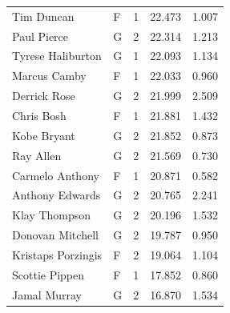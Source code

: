 \begin{table}[t]
\begin{tabular*}{\linewidth}{@{\extracolsep{\fill}}llcrr}
Tim Duncan & F & 1 & 22.473 & 1.007 \\ 
Paul Pierce & G & 2 & 22.314 & 1.213 \\ 
Tyrese Haliburton & G & 1 & 22.093 & 1.134 \\ 
Marcus Camby & F & 1 & 22.033 & 0.960 \\ 
Derrick Rose & G & 2 & 21.999 & 2.509 \\ 
Chris Bosh & F & 1 & 21.881 & 1.432 \\ 
Kobe Bryant & G & 2 & 21.852 & 0.873 \\ 
Ray Allen & G & 2 & 21.569 & 0.730 \\ 
Carmelo Anthony & F & 1 & 20.871 & 0.582 \\ 
Anthony Edwards & G & 2 & 20.765 & 2.241 \\ 
Klay Thompson & G & 2 & 20.196 & 1.532 \\ 
Donovan Mitchell & G & 2 & 19.787 & 0.950 \\ 
Kristaps Porzingis & F & 2 & 19.064 & 1.104 \\ 
Scottie Pippen & F & 1 & 17.852 & 0.860 \\ 
Jamal Murray & G & 2 & 16.870 & 1.534 \\ 
\bottomrule
\end{tabular*}
\end{table}

